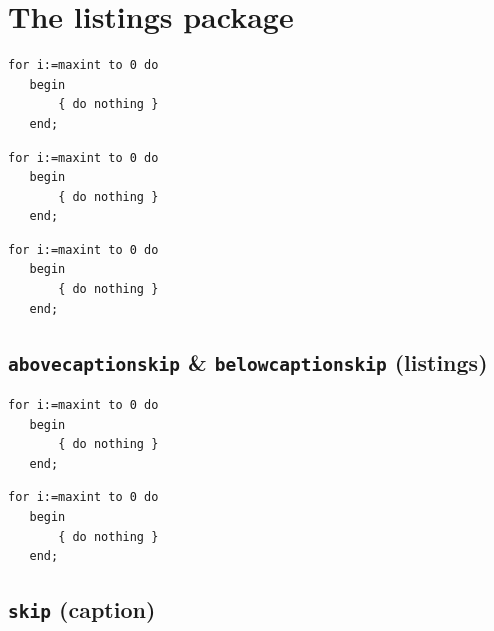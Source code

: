 \documentclass{article}
\begin{document}
\lstlistoflistings

\section{The listings package}

   \begin{lstlisting}[caption={Useless code},label=useless,captionpos=t]
   for i:=maxint to 0 do
   begin
       { do nothing }
   end;
   \end{lstlisting}

   \begin{lstlisting}[caption={Useless code},label=useless2,captionpos=b]
   for i:=maxint to 0 do
   begin
       { do nothing }
   end;
   \end{lstlisting}

   \begin{lstlisting}[title={`Caption' without label}]
   for i:=maxint to 0 do
   begin
       { do nothing }
   end;
   \end{lstlisting}


\subsection*{\texttt{abovecaptionskip} \& \texttt{belowcaptionskip} (listings)}

   \begin{lstlisting}[caption={Useless code},captionpos=t,abovecaptionskip=0pt,belowcaptionskip=10pt]
   for i:=maxint to 0 do
   begin
       { do nothing }
   end;
   \end{lstlisting}

   \begin{lstlisting}[caption={Useless code},captionpos=b,abovecaptionskip=10pt,belowcaptionskip=0pt]
   for i:=maxint to 0 do
   begin
       { do nothing }
   end;
   \end{lstlisting}

\ifx\captionsetup\undefined \else

\subsection*{\texttt{skip} (caption)}
\begingroup
  \captionsetup[lstlisting]{skip=10pt}
\end{document}
